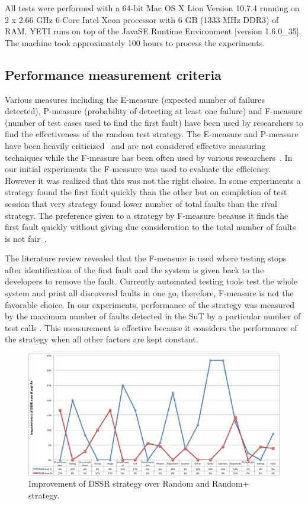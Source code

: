 \documentclass[conference]{IEEEtran}
\begin{document}
All tests were performed with a 64-bit Mac OS X Lion Version 10.7.4 running on 2 x 2.66 GHz 6-Core Intel Xeon processor with 6 GB (1333 MHz DDR3) of RAM. YETI runs on top of the Java\texttrademark  SE Runtime Environment [version 1.6.0\_35]. The machine took approximately 100 hours to process the experiments.


\subsection{Performance measurement criteria}
Various measures including the E-measure (expected number of failures detected), P-measure (probability of detecting at least one failure) and F-measure (number of test cases used to find the first fault) have been used by researchers to find the effectiveness of the random test strategy. The E-measure and P-measure have been heavily criticized~\cite{Chen2008} and are not considered effective measuring techniques while the F-measure has been often used by various researchers~\cite{Chen1996, Chen2004}. In our initial experiments the F-measure was used to evaluate the efficiency. However it was realized that this was not the right choice. In some experiments a strategy found the first fault quickly than the other but on completion of test session that very strategy found lower number of total faults than the rival strategy. The preference given to a strategy by F-measure because it finds the first fault quickly without giving due consideration to the total number of faults is not fair~\cite{Liu2012}.


  
The literature review revealed that the F-measure is used where testing stops after identification of the first fault and the system is given back to the developers to remove the fault. Currently automated testing tools test the whole system and print all discovered faults in one go, therefore, F-measure is not the favorable choice. In our experiments, performance of the strategy was measured by the maximum number of faults detected in the SuT by a particular number of test calls \cite{Pacheco2007a, Ciupa2007}. This measurement is effective because it considers the performance of the strategy when all other factors are kept constant.

\begin{figure}[ht]
\centering
\includegraphics[width=17cm]{DssrImprove.png}
\caption{Improvement of DSSR strategy over Random and Random+ strategy.}
\label{fig:LineChart}
\end{figure}
\end{document}
